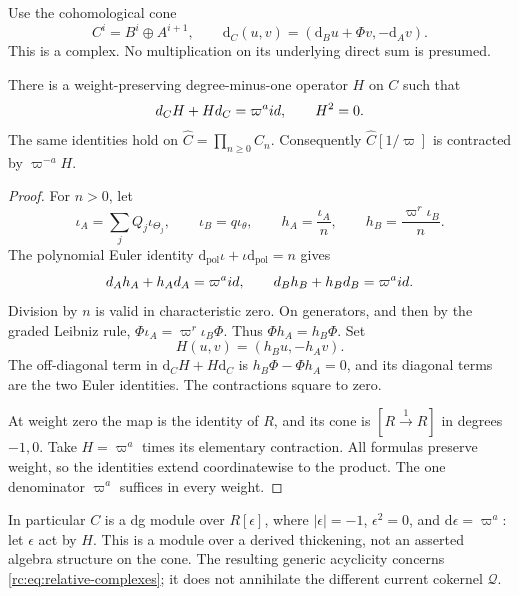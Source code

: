 Use the cohomological cone
\begin{equation}\label{rc:eq:cone}
 C^i=B^i\oplus A^{i+1},\qquad
 \mathrm d_C(u,v)=(\mathrm d_Bu+\Phi v,-\mathrm d_Av).
\end{equation}
This is a complex.  No multiplication on its underlying
direct sum is presumed.

\begin{theorem}\label{rc:thm:cone}
There is a weight-preserving degree-minus-one operator \(H\)
on \(C\) such that
\begin{equation}\label{rc:eq:homotopy}
 d_CH+Hd_C=\varpi^aid,\qquad H^2=0.
\end{equation}
The same identities hold on
\(\widehat C=\prod_{n\geq0}C_n\).
Consequently \(\widehat C[1/\varpi]\) is contracted by
\(\varpi^{-a}H\).
\end{theorem}
\begin{proof}
For \(n>0\), let
\[
 \iota_A=\sum_jQ_j\iota_{\Theta_j},\qquad
 \iota_B=q\iota_\theta,\qquad
 h_A=\frac{\iota_A}{n},\qquad
 h_B=\frac{\varpi^r\iota_B}{n}.
\]
The polynomial Euler identity
\(\mathrm d_{\mathrm{pol}}\iota+\iota\mathrm d_{\mathrm{pol}}=n\)
gives
\[
 d_Ah_A+h_Ad_A=\varpi^aid,\qquad
 d_Bh_B+h_Bd_B=\varpi^aid.
\]
Division by \(n\) is valid in characteristic zero.
On generators, and then by the graded Leibniz rule,
\(\Phi\iota_A=\varpi^r\iota_B\Phi\).  Thus
\(\Phi h_A=h_B\Phi\).  Set
\[
 H(u,v)=(h_Bu,-h_Av).
\]
The off-diagonal term in \(\mathrm d_CH+H\mathrm d_C\)
is \(h_B\Phi-\Phi h_A=0\), and its diagonal terms are the
two Euler identities.  The contractions square to zero.

At weight zero the map is the identity of \(R\), and its
cone is \([R\xrightarrow{1}R]\) in degrees \(-1,0\).
Take \(H=\varpi^a\) times its elementary contraction.
All formulas preserve weight, so the identities extend
coordinatewise to the product.  The one denominator
\(\varpi^a\) suffices in every weight.
\end{proof}

In particular \(C\) is a dg module over
\(R[\epsilon]\), where \(|\epsilon|=-1\),
\(\epsilon^2=0\), and \(\mathrm d\epsilon=\varpi^a\):
let \(\epsilon\) act by \(H\).
This is a module over a derived thickening, not an asserted
algebra structure on the cone.  The resulting generic
acyclicity concerns \eqref{rc:eq:relative-complexes};
it does not annihilate the different current cokernel
\(\mathcal Q\).

